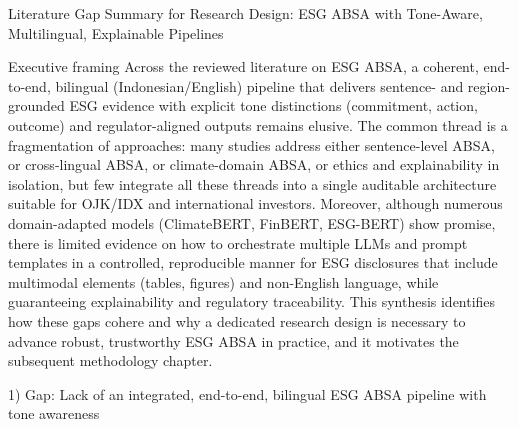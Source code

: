 Literature Gap Summary for Research Design: ESG ABSA with Tone-Aware, Multilingual, Explainable Pipelines

Executive framing
Across the reviewed literature on ESG ABSA, a coherent, end-to-end, bilingual (Indonesian/English) pipeline that delivers sentence- and region-grounded ESG evidence with explicit tone distinctions (commitment, action, outcome) and regulator-aligned outputs remains elusive. The common thread is a fragmentation of approaches: many studies address either sentence-level ABSA, or cross-lingual ABSA, or climate-domain ABSA, or ethics and explainability in isolation, but few integrate all these threads into a single auditable architecture suitable for OJK/IDX and international investors. Moreover, although numerous domain-adapted models (ClimateBERT, FinBERT, ESG-BERT) show promise, there is limited evidence on how to orchestrate multiple LLMs and prompt templates in a controlled, reproducible manner for ESG disclosures that include multimodal elements (tables, figures) and non-English language, while guaranteeing explainability and regulatory traceability. This synthesis identifies how these gaps cohere and why a dedicated research design is necessary to advance robust, trustworthy ESG ABSA in practice, and it motivates the subsequent methodology chapter.

1) Gap: Lack of an integrated, end-to-end, bilingual ESG ABSA pipeline with tone awareness

